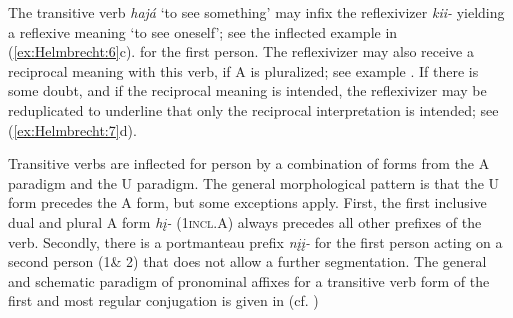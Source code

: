 \documentclass[output=paper]{langscibook}
\begin{document}
The transitive verb \textit{hajá} `to see something' may infix the reflexivizer \textit{kii-} yielding a reflexive meaning `to see oneself'; see the inflected example in (\ref{ex:Helmbrecht:6}c). for the first person. The reflexivizer may also receive a reciprocal meaning with this verb, if A is pluralized; see example . If there is some doubt, and if the reciprocal meaning is intended, the reflexivizer may be reduplicated to underline that only the reciprocal interpretation is intended; see (\ref{ex:Helmbrecht:7}d).

Transitive verbs are inflected for person by a combination of forms from the A paradigm and the U paradigm. The general morphological pattern is that the U form precedes the A form, but some exceptions apply. First, the first inclusive dual and plural A form \textit{hį-} (\textsc{1incl}.A) always precedes all other prefixes of the verb. Secondly, there is a portmanteau prefix \textit{nįį-} for the first person acting on a second person (1\& 2) that does not allow a further segmentation. The general and schematic paradigm of pronominal affixes for a transitive verb form of the first and most regular conjugation is given in  (cf. \citealt{Helmbrecht2021})
\end{document}
